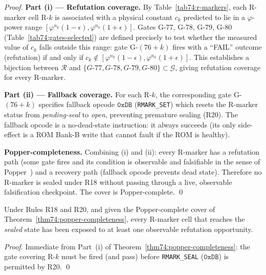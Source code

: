 \begin{proof}
\textbf{Part (i) — Refutation coverage.}
By Table~\ref{tab74:r-markers}, each R-marker cell R-$k$ is associated
with a physical constant $c_k$ predicted to lie in a $\varphi$-power
range $[\varphi^{n_k}(1-\epsilon), \varphi^{n_k}(1+\epsilon)]$.
Gates G-77, G-78, G-79, G-80 (Table~\ref{tab74:gates-selected}) are
defined precisely to test whether the measured value of $c_k$ falls
outside this range: gate G-$(76+k)$ fires with a ``FAIL'' outcome
(refutation) if and only if $c_k \notin [\varphi^{n_k}(1-\epsilon),
\varphi^{n_k}(1+\epsilon)]$.  This establishes a bijection between
$\mathcal{R}$ and $\{G\text{-}77,G\text{-}78,G\text{-}79,G\text{-}80\}
\subset \mathcal{G}$, giving refutation coverage for every R-marker.

\textbf{Part (ii) — Fallback coverage.}
For each R-$k$, the corresponding gate G-$(76+k)$ specifies fallback
opcode $\mathtt{0xDB}$ (\texttt{RMARK\_SET}) which resets the R-marker
status from \textit{pending-seal} to \textit{open}, preventing
premature sealing (R20).  The fallback opcode is a no-dead-state
instruction: it always succeeds (its only side-effect is a ROM Bank-B
write that cannot fault if the ROM is healthy).

\textbf{Popper-completeness.}
Combining (i) and (ii): every R-marker has a refutation path (some gate
fires and its condition is observable and falsifiable in the sense of
Popper~\cite{popper1959}) and a recovery path (fallback opcode prevents
dead state).  Therefore no R-marker is sealed under R18 without passing
through a live, observable falsification checkpoint.  The cover is
Popper-complete.
\qed
\end{proof}



\begin{corollary}
\label{cor74:no-silent-rmarker}
Under Rules R18 and R20, and given the Popper-complete cover of
Theorem~\ref{thm74:popper-completeness}, every R-marker cell that
reaches the \textit{sealed} state has been exposed to at least one
observable refutation opportunity.
\end{corollary}
\begin{proof}
Immediate from Part~(i) of Theorem~\ref{thm74:popper-completeness}: the
gate covering R-$k$ must be fired (and pass) before \texttt{RMARK\_SEAL}
($\mathtt{0xDB}$) is permitted by R20.
\qed
\end{proof}

